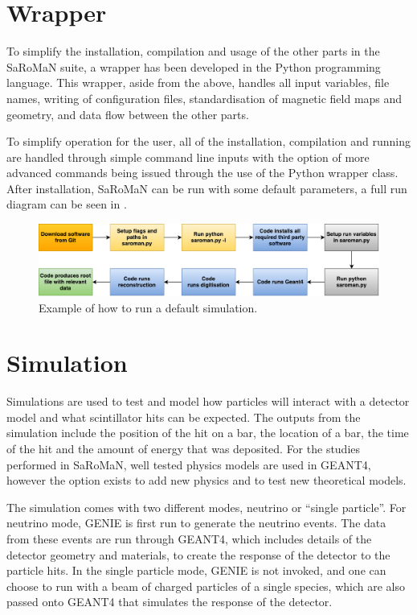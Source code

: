 \section{Wrapper}
To simplify the installation, compilation and usage of the other parts in the SaRoMaN suite, a wrapper has been developed in the Python programming language. This wrapper, aside from the above, handles all input variables, file names, writing of configuration files, standardisation of magnetic field maps and geometry, and data flow between the other parts. 

To simplify operation for the user, all of the installation, compilation and running are handled through simple command line inputs with the option of more advanced commands being issued through the use of the Python wrapper class. After installation, SaRoMaN can be run with some default parameters, a full run diagram can be seen in .

\begin{figure}[h!]
\centering
\includegraphics[width=\textwidth]{figures/block.pdf}
\caption{Example of how to run a default simulation.}
\label{fig:block}
\end{figure}

\pagebreak
\section{Simulation}
Simulations are used to test and model how particles will interact with a detector model and what scintillator hits can be expected. The outputs from the simulation include the position of the hit on a bar, the location of a bar, the time of the hit and the amount of energy that was deposited. For the studies performed in SaRoMaN, well tested physics models are used in GEANT4, however the option exists to add new physics and to test new theoretical models.

The simulation comes with two different modes, neutrino or ``single particle''. For neutrino mode, GENIE is first run to generate the neutrino events. The data from these events are run through GEANT4, which includes details of the detector geometry and materials, to create the response of the detector to the particle hits. In the single particle mode, GENIE is not invoked, and one can choose to run with a beam of charged particles of a single species, which are also passed onto GEANT4 that simulates the response of the detector.


